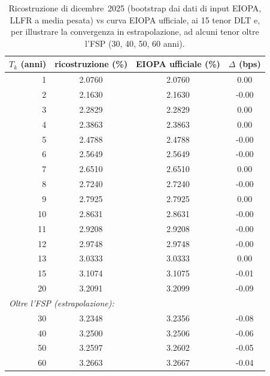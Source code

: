 \begin{table}[H]\centering\small
\caption{Ricostruzione di dicembre~2025 (bootstrap dai dati di input EIOPA, LLFR a media pesata) vs curva EIOPA ufficiale, ai 15 tenor DLT e, per illustrare la convergenza in estrapolazione, ad alcuni tenor oltre l'FSP (30, 40, 50, 60 anni).}
\label{tab:delta-dic}\renewcommand{\arraystretch}{1.15}
\begin{tabular}{rccc}
\toprule
$T_k$ (anni) & ricostruzione (\%) & EIOPA ufficiale (\%) & $\Delta$ (bps)\\
\midrule
\rowcolor{rowtint}1 & 2.0760 & 2.0760 & 0.00\\
2 & 2.1630 & 2.1630 & -0.00\\
\rowcolor{rowtint}3 & 2.2829 & 2.2829 & 0.00\\
4 & 2.3863 & 2.3863 & 0.00\\
\rowcolor{rowtint}5 & 2.4788 & 2.4788 & -0.00\\
6 & 2.5649 & 2.5649 & -0.00\\
\rowcolor{rowtint}7 & 2.6510 & 2.6510 & 0.00\\
8 & 2.7240 & 2.7240 & -0.00\\
\rowcolor{rowtint}9 & 2.7925 & 2.7925 & 0.00\\
10 & 2.8631 & 2.8631 & -0.00\\
\rowcolor{rowtint}11 & 2.9208 & 2.9208 & -0.00\\
12 & 2.9748 & 2.9748 & -0.00\\
\rowcolor{rowtint}13 & 3.0333 & 3.0333 & 0.00\\
15 & 3.1074 & 3.1075 & -0.01\\
\rowcolor{rowtint}20 & 3.2091 & 3.2099 & -0.09\\
\midrule
\multicolumn{4}{l}{\emph{Oltre l'FSP (estrapolazione):}}\\
\midrule
30 & 3.2348 & 3.2356 & -0.08\\
\rowcolor{rowtint}40 & 3.2500 & 3.2506 & -0.06\\
50 & 3.2597 & 3.2602 & -0.05\\
\rowcolor{rowtint}60 & 3.2663 & 3.2667 & -0.04\\
\bottomrule
\end{tabular}
\end{table}
